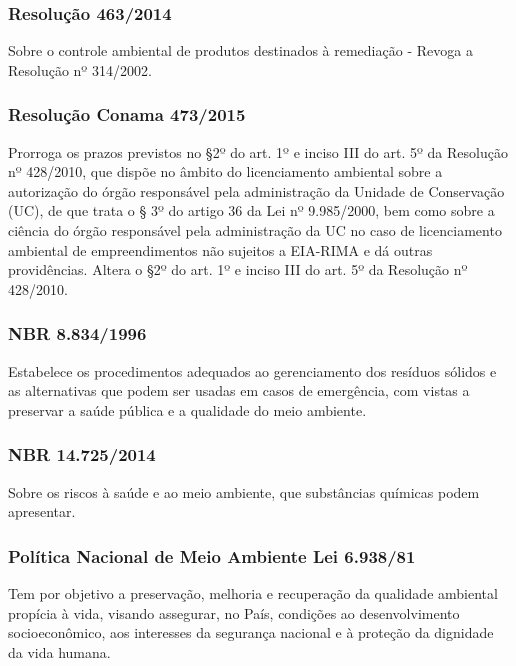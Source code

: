 \begin{subapend}
\begin{subsubapend}
		\subsubsection{Resolução 463/2014}
		Sobre o controle ambiental de produtos destinados à remediação - Revoga a Resolução nº 314/2002.
		\subsubsection{Resolução Conama 473/2015}
		Prorroga os prazos previstos no §2º do art. 1º e inciso III do art. 5º da Resolução nº 428/2010, que dispõe no âmbito do licenciamento ambiental sobre a autorização do órgão responsável pela administração da Unidade de Conservação (UC), de que trata o § 3º do artigo 36 da Lei nº 9.985/2000, bem como sobre a ciência do órgão responsável pela administração da UC no caso de licenciamento ambiental de empreendimentos não sujeitos a EIA-RIMA e dá outras providências. Altera o §2º do art. 1º e inciso III do art. 5º da Resolução nº 428/2010.
		\subsubsection{NBR 8.834/1996}
		Estabelece os procedimentos adequados ao gerenciamento dos resíduos sólidos e as alternativas que podem ser usadas em casos de emergência, com vistas a preservar a saúde pública e a qualidade do meio ambiente.
		\subsubsection{NBR 14.725/2014}
		Sobre os riscos à saúde e ao meio ambiente, que substâncias químicas podem apresentar.
		\subsubsection{Política Nacional de Meio Ambiente Lei 6.938/81}
		Tem por objetivo a preservação, melhoria e recuperação da qualidade ambiental propícia à vida, visando assegurar, no País, condições ao desenvolvimento socioeconômico, aos interesses da segurança nacional e à proteção da dignidade da vida humana.
	\end{subsubapend}
\end{subapend}

